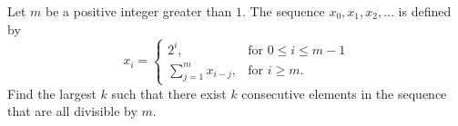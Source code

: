 Let $m$ be a positive integer greater than $1$. The sequence $x_0, x_1, x_2,\ldots$ is defined by
$$x_i= \begin{cases}
2^i,&\text{for } 0 \leq i \leq m-1\\
\sum_{j=1}^{m}x_{i-j},& \text{for } i \geq m.
\end{cases}$$
Find the largest $k$ such that there exist $k$ consecutive
elements in the sequence that are all divisible by $m$.

